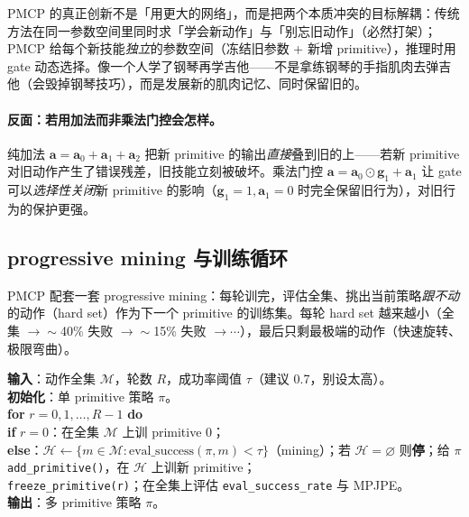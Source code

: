 \begin{insight}\label{ins:rlmc-mi-pmcp}
PMCP 的真正创新不是「用更大的网络」，而是把两个本质冲突的目标解耦：传统方法在同一参数空间里同时求「学会新动作」与「别忘旧动作」（必然打架）；PMCP 给每个新技能\emph{独立}的参数空间（冻结旧参数 + 新增 primitive），推理时用 gate 动态选择。像一个人学了钢琴再学吉他——不是拿练钢琴的手指肌肉去弹吉他（会毁掉钢琴技巧），而是发展新的肌肉记忆、同时保留旧的。
\end{insight}

\paragraph{反面：若用加法而非乘法门控会怎样。}纯加法 $\mathbf{a}=\mathbf{a}_0+\mathbf{a}_1+\mathbf{a}_2$ 把新 primitive 的输出\emph{直接}叠到旧的上——若新 primitive 对旧动作产生了错误残差，旧技能立刻被破坏。乘法门控 $\mathbf{a}=\mathbf{a}_0\odot\mathbf{g}_1+\mathbf{a}_1$ 让 gate 可以\emph{选择性关闭}新 primitive 的影响（$\mathbf{g}_1=1,\mathbf{a}_1=0$ 时完全保留旧行为），对旧行为的保护更强。

\subsection{progressive mining 与训练循环}
\label{sec:rlmc-mi-phc-mining}

PMCP 配套一套 progressive mining：每轮训完，评估全集、挑出当前策略\emph{跟不动}的动作（hard set）作为下一个 primitive 的训练集。每轮 hard set 越来越小（全集 $\to\sim$40\% 失败 $\to\sim$15\% 失败 $\to\cdots$），最后只剩最极端的动作（快速旋转、极限弯曲）。

\begin{algo}\label{alg:rlmc-mi-phc}
\textbf{输入}：动作全集 $\mathcal{M}$，轮数 $R$，成功率阈值 $\tau$（建议 0.7，别设太高）。\\
\textbf{初始化}：单 primitive 策略 $\pi$。\\
\textbf{for} $r=0,1,\dots,R-1$ \textbf{do}\\
\quad \textbf{if} $r=0$：在全集 $\mathcal{M}$ 上训 primitive 0；\\
\quad \textbf{else}：$\mathcal{H}\leftarrow\{m\in\mathcal{M}: \text{eval\_success}(\pi,m)<\tau\}$（mining）；若 $\mathcal{H}=\varnothing$ 则\textbf{停}；给 $\pi$ \verb|add_primitive()|，在 $\mathcal{H}$ 上训新 primitive；\\
\quad \verb|freeze_primitive(r)|；在全集上评估 \verb|eval_success_rate| 与 MPJPE。\\
\textbf{输出}：多 primitive 策略 $\pi$。
\end{algo}

